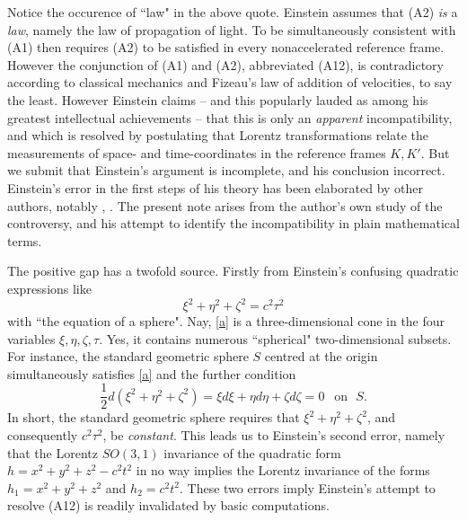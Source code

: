 \documentclass[12pt]{amsart}
\theoremstyle{definition}
\theoremstyle{remark}
\newcommand{\del}{\partial}
\begin{document}
Notice the occurence of ``law" in the above quote. Einstein assumes that (A2) \emph{is} a \emph{law}, namely the law of propagation of light. To be simultaneously consistent with (A1) then requires (A2) to be satisfied in every nonaccelerated reference frame. However the conjunction of (A1) and (A2), abbreviated (A12), is contradictory according to classical mechanics and Fizeau's law of addition of velocities, to say the least. However Einstein claims -- and this popularly lauded as among his greatest intellectual achievements -- that this is only an \emph{apparent} incompatibility, and which is resolved by postulating that Lorentz transformations relate the measurements of space- and time-coordinates in the reference frames $K, K'$. But we submit that Einstein's argument is incomplete, and his conclusion incorrect. Einstein's error in the first steps of his theory has been elaborated by other authors, notably \cite{bryant}, \cite{crothers}. The present note arises from the author's own study of the controversy, and his attempt to identify the incompatibility in plain mathematical terms. 

The positive gap has a twofold source. Firstly from Einstein's confusing quadratic expressions like \begin{equation}\label{a}\xi^2+\eta^2+\zeta^2=c^2 \tau^2
\end{equation} with ``the equation of a sphere". Nay, \eqref{a} is a three-dimensional cone in the four variables $\xi, \eta, \zeta, \tau$. Yes, it contains numerous ``spherical" two-dimensional subsets. For instance, the standard geometric sphere $S$ centred at the origin simultaneously satisfies \eqref{a} and the further condition $$\frac{1}{2}d(\xi^2+\eta^2+\zeta^2)=\xi d\xi+\eta d\eta +\zeta d\zeta=0 ~~\text{~on~~} S.$$ In short, the standard geometric sphere requires that $\xi^2+\eta^2+\zeta^2$, and consequently $c^2\tau^2$, be \emph{constant}. This leads us to Einstein's second error, namely that the Lorentz $SO(3,1)$ invariance of the quadratic form $h=x^2+y^2+z^2-c^2t^2$ in no way implies the Lorentz invariance of the forms $h_1=x^2+y^2+z^2$ and $h_2=c^2 t^2.$ These two errors imply Einstein's attempt to resolve (A12) is readily invalidated by basic computations.

\end{document}
